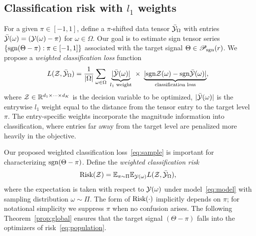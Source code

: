 \documentclass[twoside,11pt]{article}
\theoremstyle{definition}
\newcommand*{\KeepStyleUnderBrace}[1]{%
  \mathop{%
    \mathchoice
    {\underbrace{\displaystyle#1}}%
    {\underbrace{\textstyle#1}}%
    {\underbrace{\scriptstyle#1}}%
    {\underbrace{\scriptscriptstyle#1}}%
  }\limits
}
\def\sign{\textup{sgn}}
\def\caliP{\mathscr{P}_{\textup{sgn}}}
\begin{document}
\subsection{Classification risk with $l_1$ weights}\label{sec:proposal}
For a given $\pi \in [-1,1]$, define a $\pi$-shifted data tensor $\bar {\mathcal{Y}}_\Omega$ with entries $\bar {\mathcal{Y}}(\omega) = (\mathcal{Y}(\omega)-\pi)$ for $\omega\in \Omega$. Our goal is to estimate sign tensor series $\{\sign(\Theta-\pi): \pi \in[-1,1]\}$ associated with the target signal $\Theta\in \caliP(r)$. We propose a \emph{weighted classification loss} function
\begin{equation}\label{eq:sample}
L(\tZ, \bar \tY_\Omega)= {1\over |\Omega|}\sum_{\omega \in \Omega}\ \KeepStyleUnderBrace{|\bar \tY(\omega)|}_{\text{$l_1$ weight}}\  \times \ \KeepStyleUnderBrace{| \sign \tZ(\omega)-\sign \bar \tY(\omega)|}_{\text{classification loss}},
\end{equation}
where $\mathcal{Z}\in\mathbb{R}^{d_1\times \cdots \times d_K}$ is the decision variable to be optimized, $|\bar {\mathcal{Y}}(\omega)|$ is the entrywise $l_1$ weight equal to the distance from the tensor entry to the target level $\pi$. The entry-specific weights incorporate the magnitude information into classification, where entries far away from the target level are penalized more heavily in the objective. 

Our proposed weighted classification loss~\eqref{eq:sample} is important for characterizing $\sign(\Theta-\pi)$. Define the \emph{weighted classification risk}
\begin{equation}\label{eq:population}
\textup{Risk}(\mathcal{Z})=\mathbb{E}_{\pi\sim \Pi}\mathbb{E}_{\mathcal{Y}(\omega)}L(\mathcal{Z},\bar{\mathcal{Y}}_\Omega),
\end{equation}
where the expectation is taken with respect to $\mathcal{Y}(\omega)$ under model~\eqref{eq:model} with sampling distribution $\omega\sim\Pi$. %
The form of $\textup{Risk}(\cdot)$ implicitly depends on $\pi$; for notational simplicity we suppress $\pi$ when no confusion arises. The following Theorem~\ref{prop:global} ensures that the target signal $(\Theta-\pi)$ falls into the optimizers of risk~\eqref{eq:population}. 
\end{document}
